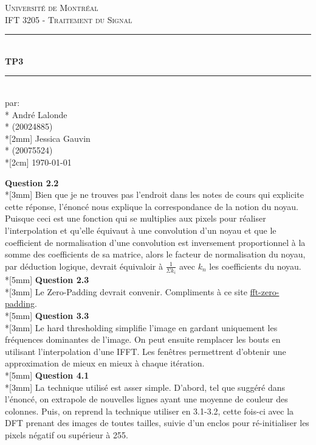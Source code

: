 \documentclass[11pt, letterpaper]{article}
\begin{document}
\begin{titlepage}
	\center
	
	\vspace*{2cm}
	
	\textsc{\LARGE Université de Montréal}\\[1cm] 
	\textsc{\Large IFT 3205 - Traitement du Signal}\\[1.5cm] 
	
	\rule{\linewidth}{0.5mm} \\[0.5cm]
	{\LARGE \bfseries TP3} \\[0.2cm] %
	\rule{\linewidth}{0.5mm} \\[3cm]
	
	\large par: \\*
	André Lalonde \\*
	(20024885) \\*[2mm]
	Jessica Gauvin \\*
	(20075524) \\*[2cm]
	{\large \today}\\[3cm]
	
	\vfill
\end{titlepage}
\newpage
\flushleft
\par{
\textbf{Question 2.2} \\*[3mm]
Bien que je ne trouves pas l'endroit dans les notes de cours qui explicite cette réponse, l'énoncé nous explique la correspondance de la notion du noyau. Puisque ceci est une fonction qui se multiplies aux pixels pour réaliser l'interpolation et qu'elle équivaut à une convolution d'un noyau et que le coefficient de normalisation d'une convolution est inversement proportionnel à la somme des coefficients de sa matrice, alors le facteur de normalisation du noyau, par déduction logique, devrait équivaloir à $\frac{1}{\Sigma k_i}$ avec $k_n$ les coefficients du noyau. \\*[5mm] 
\textbf{Question 2.3} \\*[3mm]
Le Zero-Padding devrait convenir. Compliments à ce site \href{www.bitweenie.com/lisings/fft-zero-padding/}{fft-zero-padding}. \\*[5mm]
\textbf{Question 3.3} \\*[3mm]
Le hard thresholding simplifie l'image en gardant uniquement les fréquences dominantes de l'image. On peut ensuite remplacer les bouts en utilisant l'interpolation d'une IFFT. Les fenêtres permettrent d'obtenir une approximation de mieux en mieux à chaque itération. \\*[5mm]
\textbf{Question 4.1} \\*[3mm]
La technique utilisé est asser simple. D'abord, tel que suggéré dans l'énoncé, on extrapole de nouvelles lignes ayant une moyenne de couleur des colonnes. Puis, on reprend la technique utiliser en 3.1-3.2, cette fois-ci avec la DFT prenant des images de toutes tailles, suivie d'un enclos pour ré-initialiser les pixels négatif ou supérieur à 255.
}
\end{document}
